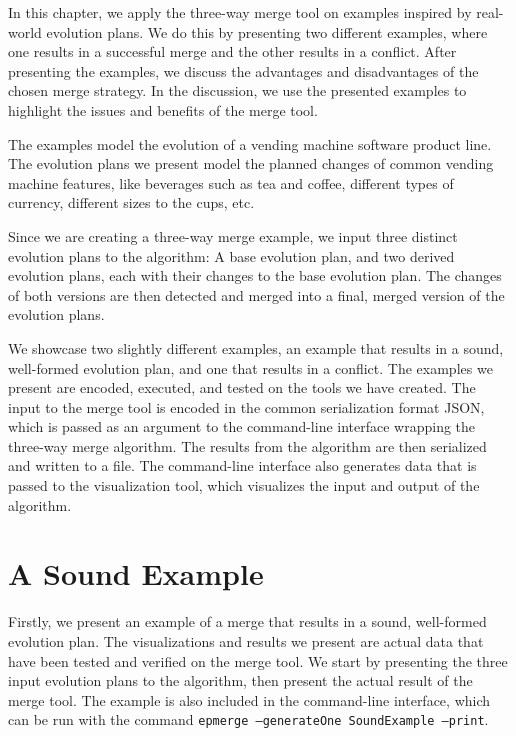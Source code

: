 \documentclass[a4paper,english]{ifimaster}
\begin{document}
In this chapter, we apply the three-way merge tool on examples inspired by real-world evolution plans. We do this by presenting two different examples, where one results in a successful merge and the other results in a conflict. After presenting the examples, we discuss the advantages and disadvantages of the chosen merge strategy. In the discussion, we use the presented examples to highlight the issues and benefits of the merge tool.

The examples model the evolution of a vending machine software product line. The evolution plans we present model the planned changes of common vending machine features, like beverages such as tea and coffee, different types of currency, different sizes to the cups, etc.

Since we are creating a three-way merge example, we input three distinct evolution plans to the algorithm: A base evolution plan, and two derived evolution plans, each with their changes to the base evolution plan. The changes of both versions are then detected and merged into a final, merged version of the evolution plans.

We showcase two slightly different examples, an example that results in a sound, well-formed evolution plan, and one that results in a conflict. The examples we present are encoded, executed, and tested on the tools we have created. The input to the merge tool is encoded in the common serialization format JSON, which is passed as an argument to the command-line interface wrapping the three-way merge algorithm. The results from the algorithm are then serialized and written to a file. The command-line interface also generates data that is passed to the visualization tool, which visualizes the input and output of the algorithm.

\section{A Sound Example}%
\label{sec:a_sound_example}

Firstly, we present an example of a merge that results in a sound, well-formed evolution plan. The visualizations and results we present are actual data that have been tested and verified on the merge tool. We start by presenting the three input evolution plans to the algorithm, then present the actual result of the merge tool. The example is also included in the command-line interface, which can be run with the command \texttt{epmerge --generateOne SoundExample --print}.
\end{document}
